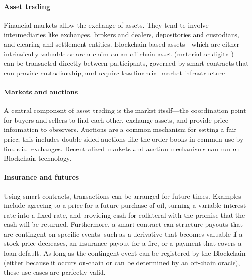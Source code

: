 \paragraph{Asset trading}

Financial markets allow the exchange of assets. 
They tend to involve intermediaries like exchanges, brokers and dealers, depositories and custodians, and clearing and settlement entities. 
Blockchain-based assets---which are either intrinsically valuable or are a claim on an off-chain asset (material or digital)---can be transacted directly between participants, governed by smart contracts that can provide custodianship, and require less financial market infrastructure.

\paragraph{Markets and auctions}

A central component of asset trading is the market itself---the coordination point for buyers and sellers to find each other, exchange assets, and provide price information to observers.
Auctions are a common mechanism for setting a fair price; this includes double-sided auctions like the order books in common use by financial exchanges. 
Decentralized markets and auction mechanisms can run on Blockchain technology.

\paragraph{Insurance and futures}
Using smart contracts, transactions can be arranged for future times.
Examples include agreeing to a price for a future purchase of oil, turning a 
variable interest rate into a fixed rate, and providing cash for collateral 
with the promise that the cash will be returned.
Furthermore, a smart contract can structure payouts that are contingent on 
specific events, such as a derivative that becomes valuable if a stock price 
decreases, an insurance payout for a fire, or a payment that covers a loan 
default.
As long as the contingent event can be registered by the Blockchain (either 
because it occurs on-chain or can be determined by an off-chain oracle), these 
use cases are perfectly valid.

